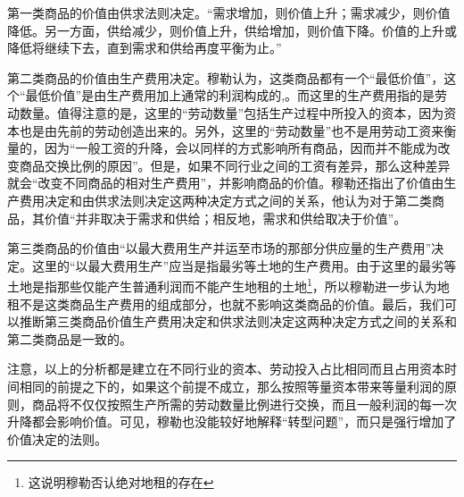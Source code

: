  第一类商品的价值由供求法则决定。“需求增加，则价值上升；需求减少，则价值降低。另一方面，供给减少，则价值上升，供给增加，则价值下降。价值的上升或降低将继续下去，直到需求和供给再度平衡为止。”\cite[506-507]{YueHan*MuLeZhengZhiJingJiXueYuanLiJiQiZaiSheHuiZheXueShangDeRuoGanYingYongShangJuan1991}

 第二类商品的价值由生产费用决定。穆勒认为，这类商品都有一个“最低价值”，这个“最低价值”是由生产费用加上通常的利润构成的,\cite[510-511]{YueHan*MuLeZhengZhiJingJiXueYuanLiJiQiZaiSheHuiZheXueShangDeRuoGanYingYongShangJuan1991}。而这里的生产费用指的是劳动数量\cite[517]{YueHan*MuLeZhengZhiJingJiXueYuanLiJiQiZaiSheHuiZheXueShangDeRuoGanYingYongShangJuan1991}。值得注意的是，这里的“劳动数量”包括生产过程中所投入的资本，因为资本也是由先前的劳动创造出来的\cite[517]{YueHan*MuLeZhengZhiJingJiXueYuanLiJiQiZaiSheHuiZheXueShangDeRuoGanYingYongShangJuan1991}。另外，这里的“劳动数量”也不是用劳动工资来衡量的，因为“一般工资的升降，会以同样的方式影响所有商品，因而并不能成为改变商品交换比例的原因”\cite[519-520]{YueHan*MuLeZhengZhiJingJiXueYuanLiJiQiZaiSheHuiZheXueShangDeRuoGanYingYongShangJuan1991}。但是，如果不同行业之间的工资有差异，那么这种差异就会“改变不同商品的相对生产费用”，并影响商品的价值\cite[521]{YueHan*MuLeZhengZhiJingJiXueYuanLiJiQiZaiSheHuiZheXueShangDeRuoGanYingYongShangJuan1991}。穆勒还指出了价值由生产费用决定和由供求法则决定这两种决定方式之间的关系，他认为对于第二类商品，其价值“并非取决于需求和供给；相反地，需求和供给取决于价值”\cite[515]{YueHan*MuLeZhengZhiJingJiXueYuanLiJiQiZaiSheHuiZheXueShangDeRuoGanYingYongShangJuan1991}。

第三类商品的价值由“以最大费用生产并运至市场的那部分供应量的生产费用”\cite[535]{YueHan*MuLeZhengZhiJingJiXueYuanLiJiQiZaiSheHuiZheXueShangDeRuoGanYingYongShangJuan1991}决定。这里的“以最大费用生产”应当是指最劣等土地的生产费用。由于这里的最劣等土地是指那些仅能产生普通利润而不能产生地租的土地\footnote{这说明穆勒否认绝对地租的存在\cite[176]{YanZhiJieXiFangJingJiXueShuoShiJiaoChengDiErBan2013}}，所以穆勒进一步认为地租不是这类商品生产费用的组成部分，也就不影响这类商品的价值\cite[596]{YueHan*MuLeZhengZhiJingJiXueYuanLiJiQiZaiSheHuiZheXueShangDeRuoGanYingYongShangJuan1991}。最后，我们可以推断第三类商品价值生产费用决定和供求法则决定这两种决定方式之间的关系和第二类商品是一致的。

注意，以上的分析都是建立在不同行业的资本、劳动投入占比相同而且占用资本时间相同的前提之下的，如果这个前提不成立，那么按照等量资本带来等量利润的原则，商品将不仅仅按照生产所需的劳动数量比例进行交换，而且一般利润的每一次升降都会影响价值\cite[526-527]{YueHan*MuLeZhengZhiJingJiXueYuanLiJiQiZaiSheHuiZheXueShangDeRuoGanYingYongShangJuan1991}。可见，穆勒也没能较好地解释“转型问题”，而只是强行增加了价值决定的法则。

